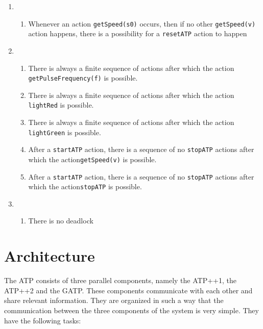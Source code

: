 \documentclass[11pt,a4paper]{article}
\newcommand{\stopATP}{\texttt{stopATP} }
\newcommand{\startATP}{\texttt{startATP} }
\newcommand{\resetATP}{\texttt{resetATP} }
\newcommand{\getSpeed}[1]{\texttt{getSpeed(#1)} }
\newcommand{\getPulseFrequency}[1]{\texttt{getPulseFrequency(#1)} }
\newcommand{\lightRed}{\texttt{lightRed} }
\newcommand{\lightGreen}{\texttt{lightGreen} }
\newcommand{\bellOff}{\texttt{bellOff} }
\newcommand{\brakesOff}{\texttt{brakesOff} }
\begin{document}
\begin{enumerate}
\begin{enumerate}
		\item Whenever there is at least one \getSpeed{s0}action, followed by no \getSpeed{v} actions, followed by a \resetATP action, then after a finite number of steps, a \brakesOff action will happen.
		
		\item Whenever there is at least one \getSpeed{s0} action, followed by no \getSpeed{v} actions, followed by a \resetATP action, then after a finite number of steps, a \bellOff action will happen.
		\end{enumerate}
		\item
		\begin{enumerate}
		\item Whenever an action \getSpeed{s0} occurs, then if no other \getSpeed{v} action happens, there is a possibility for a \resetATP action to happen
		\end{enumerate}
		\item
		\begin{enumerate}
		\item There is always a finite sequence of actions after which the action \getPulseFrequency{f} is possible.
		\item There is always a finite sequence of actions after which the action \lightRed is possible.
		\item There is always a finite sequence of actions after which the action \lightGreen is possible.
	  \item After a \startATP action, there is a sequence of no \stopATP actions after which the action\getSpeed{v} is possible.
		\item After a \startATP action, there is a sequence of no \stopATP actions after which the action\stopATP is possible.
		
		\end{enumerate}

		
	\item
    \begin{enumerate}		
		 \item There is no deadlock

	\end{enumerate}
\newpage
\end{enumerate}

\section{Architecture}

The ATP consists of three parallel components, namely the ATP++1, the ATP++2 and the GATP. These components communicate with each other and share relevant information. They are organized in such a way that the communication between the three components of the system is very simple. They have the following tasks:\\
\end{document}
